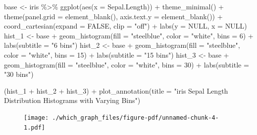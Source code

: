 \documentclass[
  letterpaper,
]{book}
\newenvironment{Shaded}{\begin{snugshade}}{\end{snugshade}}
\newcommand{\AttributeTok}[1]{\textcolor[rgb]{0.40,0.45,0.13}{#1}}
\newcommand{\ConstantTok}[1]{\textcolor[rgb]{0.56,0.35,0.01}{#1}}
\newcommand{\DecValTok}[1]{\textcolor[rgb]{0.68,0.00,0.00}{#1}}
\newcommand{\FunctionTok}[1]{\textcolor[rgb]{0.28,0.35,0.67}{#1}}
\newcommand{\NormalTok}[1]{\textcolor[rgb]{0.00,0.23,0.31}{#1}}
\newcommand{\OtherTok}[1]{\textcolor[rgb]{0.00,0.23,0.31}{#1}}
\newcommand{\SpecialCharTok}[1]{\textcolor[rgb]{0.37,0.37,0.37}{#1}}
\newcommand{\StringTok}[1]{\textcolor[rgb]{0.13,0.47,0.30}{#1}}
\begin{document}
\begin{Shaded}
\begin{Highlighting}[]
\NormalTok{base }\OtherTok{\textless{}{-}}\NormalTok{ iris }\SpecialCharTok{\%\textgreater{}\%} \FunctionTok{ggplot}\NormalTok{(}\FunctionTok{aes}\NormalTok{(}\AttributeTok{x =}\NormalTok{ Sepal.Length))  }\SpecialCharTok{+} \FunctionTok{theme\_minimal}\NormalTok{() }\SpecialCharTok{+} \FunctionTok{theme}\NormalTok{(}\AttributeTok{panel.grid =} \FunctionTok{element\_blank}\NormalTok{(), }\AttributeTok{axis.text.y =} \FunctionTok{element\_blank}\NormalTok{()) }\SpecialCharTok{+} 
  \FunctionTok{coord\_cartesian}\NormalTok{(}\AttributeTok{expand =} \ConstantTok{FALSE}\NormalTok{, }\AttributeTok{clip =} \StringTok{"off"}\NormalTok{) }\SpecialCharTok{+} \FunctionTok{labs}\NormalTok{(}\AttributeTok{y =} \ConstantTok{NULL}\NormalTok{, }\AttributeTok{x =} \ConstantTok{NULL}\NormalTok{)}
\NormalTok{hist\_1 }\OtherTok{\textless{}{-}}\NormalTok{ base }\SpecialCharTok{+} \FunctionTok{geom\_histogram}\NormalTok{(}\AttributeTok{fill =} \StringTok{"steelblue"}\NormalTok{, }\AttributeTok{color =} \StringTok{"white"}\NormalTok{, }\AttributeTok{bins =} \DecValTok{6}\NormalTok{) }\SpecialCharTok{+} \FunctionTok{labs}\NormalTok{(}\AttributeTok{subtitle =} \StringTok{"6 bins"}\NormalTok{)}
\NormalTok{hist\_2 }\OtherTok{\textless{}{-}}\NormalTok{ base }\SpecialCharTok{+} \FunctionTok{geom\_histogram}\NormalTok{(}\AttributeTok{fill =} \StringTok{"steelblue"}\NormalTok{, }\AttributeTok{color =} \StringTok{"white"}\NormalTok{, }\AttributeTok{bins =} \DecValTok{15}\NormalTok{) }\SpecialCharTok{+} \FunctionTok{labs}\NormalTok{(}\AttributeTok{subtitle =} \StringTok{"15 bins"}\NormalTok{)}
\NormalTok{hist\_3 }\OtherTok{\textless{}{-}}\NormalTok{ base }\SpecialCharTok{+} \FunctionTok{geom\_histogram}\NormalTok{(}\AttributeTok{fill =} \StringTok{"steelblue"}\NormalTok{, }\AttributeTok{color =} \StringTok{"white"}\NormalTok{, }\AttributeTok{bins =} \DecValTok{30}\NormalTok{) }\SpecialCharTok{+} \FunctionTok{labs}\NormalTok{(}\AttributeTok{subtitle =} \StringTok{"30 bins"}\NormalTok{)}

\NormalTok{(hist\_1 }\SpecialCharTok{+}\NormalTok{ hist\_2 }\SpecialCharTok{+}\NormalTok{ hist\_3) }\SpecialCharTok{+} \FunctionTok{plot\_annotation}\NormalTok{(}\AttributeTok{title =} \StringTok{"iris Sepal Length Distribution Histograms with Varying Bins"}\NormalTok{)}
\end{Highlighting}
\end{Shaded}

\begin{figure}[H]

{\centering \texttt{[image: ./which\_graph\_files/figure-pdf/unnamed-chunk-4-1.pdf]}

}

\end{figure}
\end{document}
